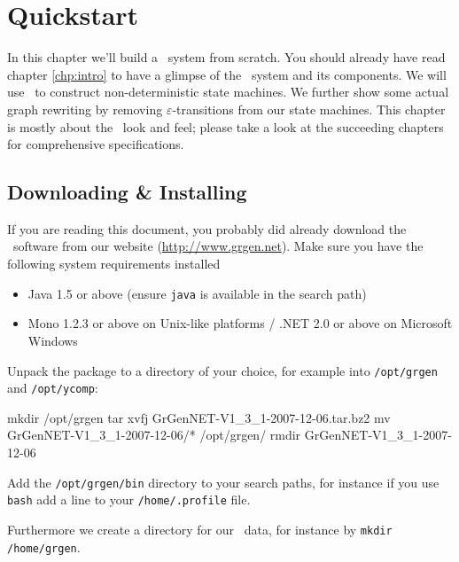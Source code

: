 \chapter{Quickstart}

In this chapter we'll build a \GrG\ system from scratch. 
You should already have read chapter \ref{chp:intro} to have a glimpse of the \GrG\ system and its components.
We will use \GrG\ to construct non-deterministic state machines.
We further show some actual graph rewriting by removing $\varepsilon$-transitions from our state machines.
This chapter is mostly about the \GrG\ look and feel; please take a look at the succeeding chapters for comprehensive specifications.

\section{Downloading \& Installing}
If you are reading this document, you probably did already download the \GrG\ software from our website (\url{http://www.grgen.net}).
Make sure you have the following system requirements installed
\begin{itemize}
	\item Java 1.5 or above \footnotesize{(ensure \texttt{java} is available in the search path)}
	\item Mono 1.2.3 or above on Unix-like platforms / .NET 2.0 or above on Microsoft Windows 
\end{itemize}
Unpack the package to a directory of your choice, for example into \texttt{/opt/grgen} and \texttt{/opt/ycomp}:
\begin{bash}
mkdir /opt/grgen
tar xvfj GrGenNET-V1_3_1-2007-12-06.tar.bz2
mv GrGenNET-V1_3_1-2007-12-06/* /opt/grgen/
rmdir GrGenNET-V1_3_1-2007-12-06
\end{bash}
Add the \texttt{/opt/grgen/bin} directory to your search paths, for instance if you use \texttt{bash} add a line to your \texttt{/home/.profile} file.
Furthermore we create a directory for our \GrG\ data, for instance by \texttt{mkdir /home/grgen}.

